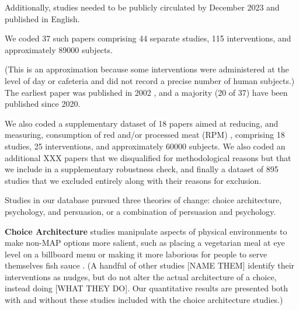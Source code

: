 \documentclass[sn-nature,pdflatex]{sn-jnl}
\begin{document}
Additionally, studies needed to be publicly circulated by December 2023
and published in English.

We coded 37 such papers
\citep{aldoh2023, allen2002, alblas2023, coker2022, griesoph2021, piester2020, sparkman2017, sparkman2020, andersson2021, kanchanachitra2020, bochmann2017, bschaden2020, cooney2016, feltz2022, haile2021, mathur2021effectiveness, peacock2017, polanco2022, sparkman2021, abrahamse2007, acharya2004, banerjee2019, berndsen2005, bertolaso2015, bianchi2022, fehrenbach2015, hatami2018, jalil2023, merrill2009, norris2014, shreedhar2021, weingarten2022, carfora2023, hennessy2016, mattson2020}
comprising 44 separate studies, 115 interventions, and approximately
89000 subjects.

\begin{comment} 
make sure to edit this to include new studies!
\end{comment}

(This is an approximation because some interventions were administered
at the level of day or cafeteria and did not record a precise number of
human subjects.) The earliest paper was published in 2002
\citep{allen2002}, and a majority (20 of 37) have been published since
2020.

We also coded a supplementary dataset of 18 papers aimed at reducing,
and measuring, consumption of red and/or processed meat (RPM)
\citep{carfora2017correlational, carfora2017randomised, carfora2019, carfora2019informational, delichatsios2001, dijkstra2022, emmons2005cancer, emmons2005project, jaacks2014, james2015, lee2018, perino2022, schatzkin2000, sorensen2005},
comprising 18 studies, 25 interventions, and approximately 60000
subjects. We also coded an additional XXX papers that we disqualified
for methodological reasons but that we include in a supplementary
robustness check, and finally a dataset of 895 studies that we excluded
entirely along with their reasons for exclusion.

Studies in our database pursued three theories of change: choice
architecture, psychology, and persuasion, or a combination of persuasion
and psychology.

\textbf{Choice Architecture} studies
\citep{andersson2021, kanchanachitra2020} manipulate aspects of physical
environments to make non-MAP options more salient, such as placing a
vegetarian meal at eye level on a billboard menu \citep{andersson2021}
or making it more laborious for people to serve themselves fish sauce
\citep{kanchanachitra2020}. (A handful of other studies {[}NAME THEM{]}
identify their interventions as nudges, but do not alter the actual
architecture of a choice, instead doing {[}WHAT THEY DO{]}. Our
quantitative results are presented both with and without these studies
included with the choice architecture studies.)
\end{document}
